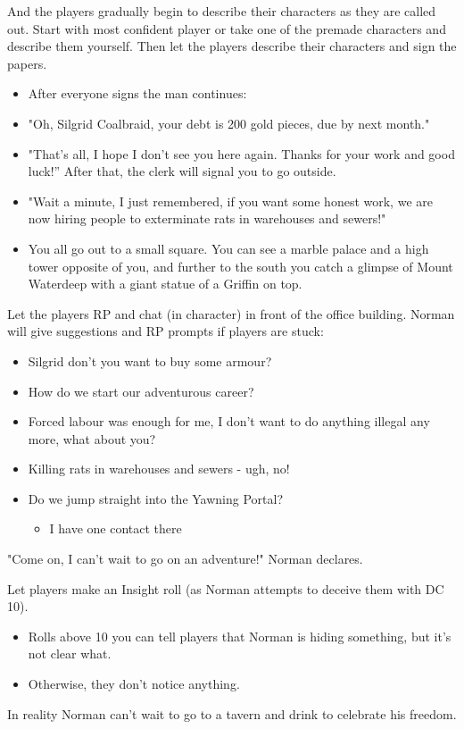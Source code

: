 \documentclass[10pt,onecolumn,twoside,openany,bg=full,layout=true]{dndbook}
\begin{document}
And the players gradually begin to describe their characters as they are called out.
Start with most confident player or take one of the premade characters and describe them yourself.
Then let the players describe their characters and sign the papers.
\begin{DndReadAloud}
\begin{itemize}
  \item After everyone signs the man continues:
  \item "Oh, Silgrid Coalbraid, your debt is 200 gold pieces, due by next month."
  \item "That's all, I hope I don't see you here again. Thanks for your work and good luck!” After that, the clerk will signal you to go outside.
  \item "Wait a minute, I just remembered, if you want some honest work, we are now hiring people to exterminate rats in warehouses and sewers!"
  \item You all go out to a small square.
You can see a marble palace and a high tower opposite of you, and further to the south you catch a glimpse of Mount Waterdeep with a giant statue of a Griffin on top.
\end{itemize}
\end{DndReadAloud}
Let the players RP and chat (in character) in front of the office building.
Norman will give suggestions and RP prompts if players are stuck:
\begin{itemize}
  \item Silgrid don't you want to buy some armour?
  \item How do we start our adventurous career?
  \item Forced labour was enough for me, I don’t want to do anything illegal any more, what about you?
  \item Killing rats in warehouses and sewers - ugh, no!
  \item Do we jump straight into the Yawning Portal?
  \begin{itemize}
    \item I have one contact there
  \end{itemize}
\end{itemize}
\begin{DndReadAloud}
"Come on, I can't wait to go on an adventure!" Norman declares.
\end{DndReadAloud}
Let players make an Insight roll (as Norman attempts to deceive them with DC 10).
\begin{itemize}
\item Rolls above 10 you can tell players that Norman is hiding something, but it's not clear what.
\item Otherwise, they don't notice anything.
\end{itemize}
In reality Norman can't wait to go to a tavern and drink to celebrate his freedom.
\end{document}
